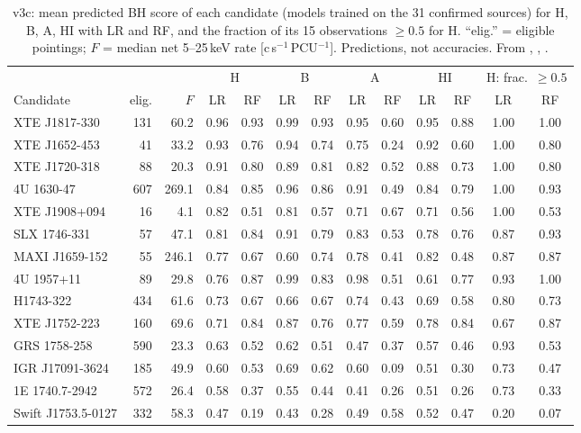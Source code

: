 \begin{table}[htbp]
\centering\scriptsize
\caption[v3c candidate predictions]{v3c: mean predicted BH score of each candidate (models trained on the 31 confirmed
sources) for H, B, A, HI with LR and RF, and the fraction of its 15 observations $\ge0.5$ for H. ``elig.'' = eligible
pointings; $F$ = median net 5--25\,keV rate [c\,s$^{-1}$\,PCU$^{-1}$]. Predictions, not accuracies. From
, , .}
\label{tab:p1v3c}
\setlength{\tabcolsep}{3.5pt}
\begin{tabular}{@{}lrr cccccccc cc@{}}
\toprule
 & & & \multicolumn{2}{c}{H} & \multicolumn{2}{c}{B} & \multicolumn{2}{c}{A} & \multicolumn{2}{c}{HI} & \multicolumn{2}{c}{H: frac.\ $\ge0.5$}\\
Candidate & elig. & $F$ & LR & RF & LR & RF & LR & RF & LR & RF & LR & RF \\
\midrule
XTE J1817-330 & 131 & 60.2 & 0.96 & 0.93 & 0.99 & 0.93 & 0.95 & 0.60 & 0.95 & 0.88 & 1.00 & 1.00 \\
XTE J1652-453 & 41 & 33.2 & 0.93 & 0.76 & 0.94 & 0.74 & 0.75 & 0.24 & 0.92 & 0.60 & 1.00 & 0.80 \\
XTE J1720-318 & 88 & 20.3 & 0.91 & 0.80 & 0.89 & 0.81 & 0.82 & 0.52 & 0.88 & 0.73 & 1.00 & 0.80 \\
4U 1630-47 & 607 & 269.1 & 0.84 & 0.85 & 0.96 & 0.86 & 0.91 & 0.49 & 0.84 & 0.79 & 1.00 & 0.93 \\
XTE J1908+094 & 16 & 4.1 & 0.82 & 0.51 & 0.81 & 0.57 & 0.71 & 0.67 & 0.71 & 0.56 & 1.00 & 0.53 \\
SLX 1746-331 & 57 & 47.1 & 0.81 & 0.84 & 0.91 & 0.79 & 0.83 & 0.53 & 0.78 & 0.76 & 0.87 & 0.93 \\
MAXI J1659-152 & 55 & 246.1 & 0.77 & 0.67 & 0.60 & 0.74 & 0.78 & 0.41 & 0.82 & 0.48 & 0.87 & 0.87 \\
4U 1957+11 & 89 & 29.8 & 0.76 & 0.87 & 0.99 & 0.83 & 0.98 & 0.51 & 0.61 & 0.77 & 0.93 & 1.00 \\
H1743-322 & 434 & 61.6 & 0.73 & 0.67 & 0.66 & 0.67 & 0.74 & 0.43 & 0.69 & 0.58 & 0.80 & 0.73 \\
XTE J1752-223 & 160 & 69.6 & 0.71 & 0.84 & 0.87 & 0.76 & 0.77 & 0.59 & 0.78 & 0.84 & 0.67 & 0.87 \\
GRS 1758-258 & 590 & 23.3 & 0.63 & 0.52 & 0.62 & 0.51 & 0.47 & 0.37 & 0.57 & 0.46 & 0.93 & 0.53 \\
IGR J17091-3624 & 185 & 49.9 & 0.60 & 0.53 & 0.69 & 0.62 & 0.60 & 0.09 & 0.51 & 0.30 & 0.73 & 0.47 \\
1E 1740.7-2942 & 572 & 26.4 & 0.58 & 0.37 & 0.55 & 0.44 & 0.41 & 0.26 & 0.51 & 0.26 & 0.73 & 0.33 \\
Swift J1753.5-0127 & 332 & 58.3 & 0.47 & 0.19 & 0.43 & 0.28 & 0.49 & 0.58 & 0.52 & 0.47 & 0.20 & 0.07 \\
\bottomrule
\end{tabular}
\end{table}

